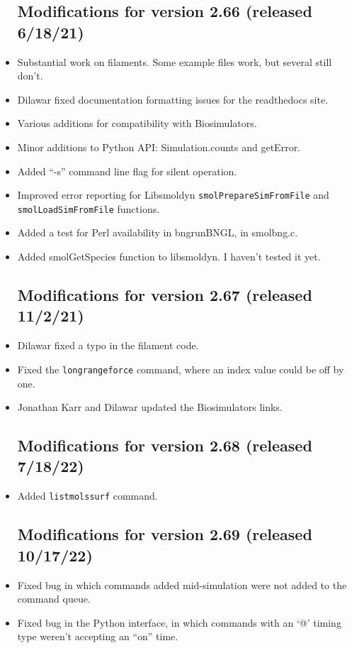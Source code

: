 \documentclass {scrbook}
\newcommand {\ttt} {\texttt}
\begin{document}
\begin{itemize}
\subsection{Modifications for version 2.66 (released 6/18/21)}
\item Substantial work on filaments. Some example files work, but several still don't.
\item Dilawar fixed documentation formatting issues for the readthedocs site.
\item Various additions for compatibility with Biosimulators.
\item Minor additions to Python API: Simulation.counts and getError.
\item Added ``-s'' command line flag for silent operation.
\item Improved error reporting for Libsmoldyn \ttt{smolPrepareSimFromFile} and \ttt{smolLoadSimFromFile} functions.
\item Added a test for Perl availability in bngrunBNGL, in smolbng.c.
\item Added smolGetSpecies function to libsmoldyn. I haven't tested it yet.

\subsection{Modifications for version 2.67 (released 11/2/21)}
\item Dilawar fixed a typo in the filament code.
\item Fixed the \ttt{longrangeforce} command, where an index value could be off by one.
\item Jonathan Karr and Dilawar updated the Biosimulators links.

\subsection{Modifications for version 2.68 (released 7/18/22)}
\item Added \ttt{listmolssurf} command.

\subsection{Modifications for version 2.69 (released 10/17/22)}
\item Fixed bug in which commands added mid-simulation were not added to the command queue.
\item Fixed bug in the Python interface, in which commands with an `@' timing type weren't accepting an ``on'' time.


\end{itemize}
\end{document}
